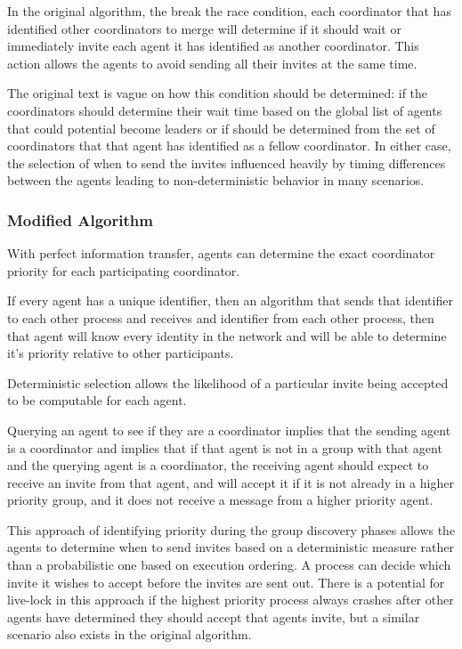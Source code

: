 In the original algorithm, the break the race condition, each coordinator that has identified other coordinators to merge will determine if it should wait or immediately invite each agent it has identified as another coordinator. This action allows the agents to avoid sending all their invites at the same time.

The original text is vague on how this condition should be determined: if the coordinators should determine their wait time based on the global list of agents that could potential become leaders or if should be determined from the set of coordinators that that agent has identified as a fellow coordinator. In either case, the selection of when to send the invites influenced heavily by timing differences between the agents leading to non-deterministic behavior in many scenarios.

\subsubsection{Modified Algorithm}

\begin{thm}
With perfect information transfer, agents can determine the exact coordinator priority for each participating coordinator.
\end{thm}

If every agent has a unique identifier, then an algorithm that sends that identifier to each other process and receives and identifier from each other process, then that agent will know every identity in the network and will be able to determine it's priority relative to other participants.

\begin{thm}
Deterministic selection allows the likelihood of a particular invite being accepted to be computable for each agent.
\end{thm}

Querying an agent to see if they are a coordinator implies that the sending agent is a coordinator and implies that if that agent is not in a group with that agent and the querying agent is a coordinator, the receiving agent should expect to receive an invite from that agent, and will accept it if it is not already in a higher priority group, and it does not receive a message from a higher priority agent.

This approach of identifying priority during the group discovery phases allows the agents to determine when to send invites based on a deterministic measure rather than a probabilistic one based on execution ordering. A process can decide which invite it wishes to accept before the invites are sent out. There is a potential for live-lock in this approach if the highest priority process always crashes after other agents have determined they should accept that agents invite, but a similar scenario also exists in the original algorithm.

